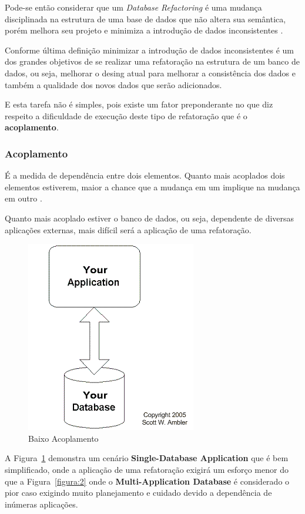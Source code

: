 \documentclass[10pt]{article}
\begin{document}
	Pode-se então considerar que um \textit{Database Refactoring} é uma mudança disciplinada na estrutura de uma base de dados que não altera sua semântica, porém melhora seu projeto e minimiza a introdução de dados inconsistentes \cite{Mello:DatabaseRefactoring}.

	Conforme última definição minimizar a introdução de dados inconsistentes é um dos grandes objetivos de se realizar uma refatoração na estrutura de um banco de dados, ou seja, melhorar o desing atual para melhorar a consistência dos dados e também a qualidade dos novos dados que serão adicionados.

	E esta tarefa não é simples, pois existe um fator preponderante no que diz respeito a dificuldade de execução deste tipo de refatoração que é o \textbf{acoplamento}.

\subsubsection{Acoplamento}\label{subsec:acoplamento}
	É a medida de dependência entre dois elementos. Quanto mais acoplados dois elementos estiverem, maior a chance que a mudança em um implique na mudança em outro \cite{Wikipedia:Coupling}. 

	Quanto mais acoplado estiver o banco de dados, ou seja, dependente de diversas aplicações externas, mais difícil será a aplicação de uma refatoração\cite{Ambler:RefactoringDatabases}.
	
	\begin{figure}[ht]
		\centering
		\includegraphics[width=.3\textwidth]{img/dataRefactoringBestCase.png}
		\caption{Baixo Acoplamento}
		\label{figura:1}
	\end{figure}
	
	A Figura~\ref{figura:1} demonstra um cenário \textbf{Single-Database Application} que é bem simplificado, onde a aplicação de uma refatoração exigirá um esforço menor do que a Figura~\ref{figura:2} onde o \textbf{Multi-Application Database} é considerado o pior caso exigindo muito planejamento e cuidado devido a dependência de inúmeras aplicações.
\end{document}
